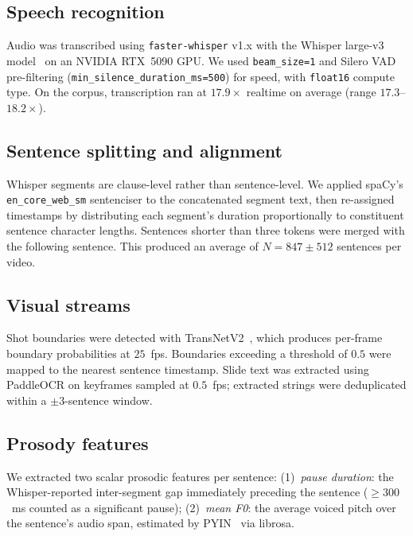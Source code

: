 \subsection{Speech recognition}

Audio was transcribed using \texttt{faster-whisper} v1.x with the
Whisper large-v3 model~\citep{radford2023robust} on an NVIDIA RTX~5090 GPU.
We used \texttt{beam\_size=1} and Silero VAD pre-filtering
(\texttt{min\_silence\_duration\_ms=500}) for speed, with \texttt{float16}
compute type.
On the \dataset{} corpus, transcription ran at $17.9\times$ realtime on average
(range $17.3$--$18.2\times$).

\subsection{Sentence splitting and alignment}

Whisper segments are clause-level rather than sentence-level.
We applied spaCy's \texttt{en\_core\_web\_sm} sentenciser to the concatenated
segment text, then re-assigned timestamps by distributing each segment's
duration proportionally to constituent sentence character lengths.
Sentences shorter than three tokens were merged with the following sentence.
This produced an average of $N = 847 \pm 512$ sentences per video.

\subsection{Visual streams}

Shot boundaries were detected with TransNetV2~\citep{soucek2020transnet},
which produces per-frame boundary probabilities at $25$~fps.
Boundaries exceeding a threshold of $0.5$ were mapped to the nearest sentence
timestamp.
Slide text was extracted using PaddleOCR on keyframes sampled at $0.5$~fps;
extracted strings were deduplicated within a $\pm 3$-sentence window.

\subsection{Prosody features}

We extracted two scalar prosodic features per sentence:
(1)~\emph{pause duration}: the Whisper-reported inter-segment gap immediately
preceding the sentence ($\geq 300$~ms counted as a significant pause);
(2)~\emph{mean F0}: the average voiced pitch over the sentence's audio span,
estimated by PYIN~\citep{mauch2014pyin} via librosa.

